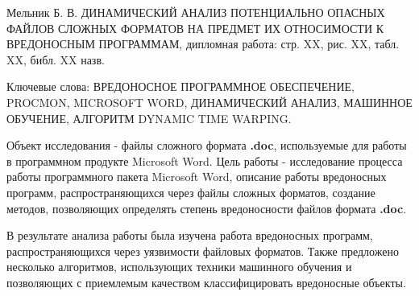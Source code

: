 
Мельник Б. В. ДИНАМИЧЕСКИЙ АНАЛИЗ ПОТЕНЦИАЛЬНО ОПАСНЫХ ФАЙЛОВ СЛОЖНЫХ ФОРМАТОВ НА ПРЕДМЕТ ИХ ОТНОСИМОСТИ К ВРЕДОНОСНЫМ ПРОГРАММАМ, дипломная работа: стр. XX, рис. XX, табл. XX, библ. XX назв.

Ключевые слова: ВРЕДОНОСНОЕ ПРОГРАММНОЕ ОБЕСПЕЧЕНИЕ, PROCMON, MICROSOFT WORD, ДИНАМИЧЕСКИЙ АНАЛИЗ, МАШИННОЕ ОБУЧЕНИЕ, АЛГОРИТМ DYNAMIC TIME WARPING.

Объект исследования - файлы сложного формата \textbf{.doc}, используемые для работы в программном продукте Microsoft Word.
Цель работы - исследование процесса работы программного пакета Microsoft Word, описание работы вредоносных программ, распространяющихся через файлы сложных форматов, создание методов, позволяющих определять степень вредоносности файлов формата \textbf{.doc}.

В результате анализа работы была изучена работа вредоносных программ, распространяющихся через уязвимости файловых форматов. Также предложено несколько алгоритмов, использующих техники машинного обучения и позволяющих с приемлемым качеством классифицировать вредоносные объекты.